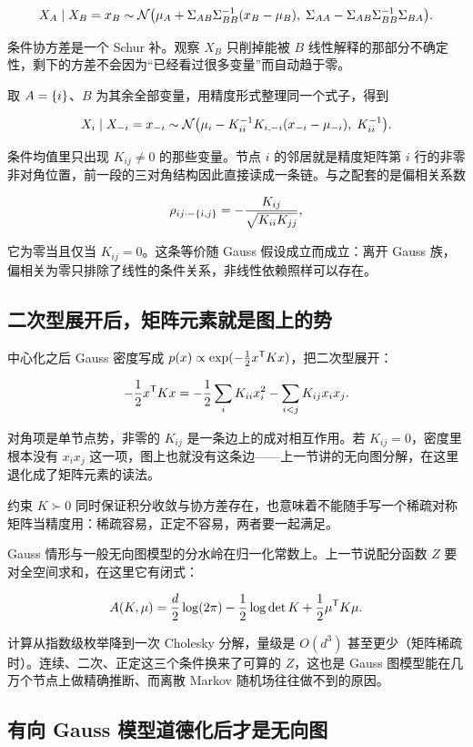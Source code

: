 \[
X_A\mid X_B=x_B
\sim
\mathcal N\bigl(
\mu_A+\Sigma_{AB}\Sigma_{BB}^{-1}(x_B-\mu_B),
\;
\Sigma_{AA}-\Sigma_{AB}\Sigma_{BB}^{-1}\Sigma_{BA}
\bigr).
\]

条件协方差是一个 Schur 补。观察 \(X_B\) 只削掉能被 \(B\) 线性解释的那部分不确定性，剩下的方差不会因为``已经看过很多变量''而自动趋于零。

取 \(A=\left\{i\right\}\)、\(B\) 为其余全部变量，用精度形式整理同一个式子，得到

\[
X_i\mid X_{-i}=x_{-i}
\sim
\mathcal N\bigl(
\mu_i-K_{ii}^{-1}K_{i,-i}(x_{-i}-\mu_{-i}),
\;
K_{ii}^{-1}
\bigr).
\]

条件均值里只出现 \(K_{ij}\neq 0\) 的那些变量。节点 \(i\) 的邻居就是精度矩阵第 \(i\) 行的非零非对角位置，前一段的三对角结构因此直接读成一条链。与之配套的是偏相关系数

\[
\rho_{ij\cdot-\left\{i,j\right\}}
=-\frac{K_{ij}}{\sqrt{K_{ii}K_{jj}}},
\]

它为零当且仅当 \(K_{ij}=0\)。这条等价随 Gauss 假设成立而成立：离开 Gauss 族，偏相关为零只排除了线性的条件关系，非线性依赖照样可以存在。

\subsection{二次型展开后，矩阵元素就是图上的势}

中心化之后 Gauss 密度写成 \(p(x)\propto\exp(-\tfrac12 x^{\mathsf{T}}Kx)\)，把二次型展开：

\[
-\frac12x^{\mathsf{T}}Kx
=-\frac12\sum_i K_{ii}x_i^2
-\sum_{i<j}K_{ij}x_ix_j.
\]

对角项是单节点势，非零的 \(K_{ij}\) 是一条边上的成对相互作用。若 \(K_{ij}=0\)，密度里根本没有 \(x_ix_j\) 这一项，图上也就没有这条边——上一节讲的无向图分解，在这里退化成了矩阵元素的读法。

约束 \(K\succ0\) 同时保证积分收敛与协方差存在，也意味着不能随手写一个稀疏对称矩阵当精度用：稀疏容易，正定不容易，两者要一起满足。

Gauss 情形与一般无向图模型的分水岭在归一化常数上。上一节说配分函数 \(Z\) 要对全空间求和，在这里它有闭式：

\[
A(K,\mu)=\frac d2\log(2\pi)-\frac12\log\det K+\frac12\mu^{\mathsf{T}}K\mu .
\]

计算从指数级枚举降到一次 Cholesky 分解，量级是 \(O(d^3)\) 甚至更少（矩阵稀疏时）。连续、二次、正定这三个条件换来了可算的 \(Z\)，这也是 Gauss 图模型能在几万个节点上做精确推断、而离散 Markov 随机场往往做不到的原因。

\subsection{有向 Gauss 模型道德化后才是无向图}

